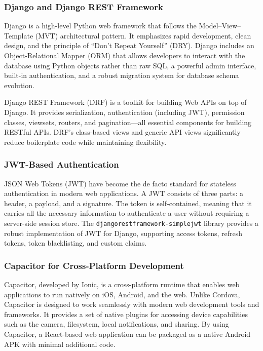 \subsubsection{Django and Django REST Framework}
Django is a high-level Python web framework that follows the Model--View--Template (MVT) architectural pattern. It emphasizes rapid development, clean design, and the principle of ``Don't Repeat Yourself'' (DRY). Django includes an Object-Relational Mapper (ORM) that allows developers to interact with the database using Python objects rather than raw SQL, a powerful admin interface, built-in authentication, and a robust migration system for database schema evolution.

Django REST Framework (DRF) is a toolkit for building Web APIs on top of Django. It provides serialization, authentication (including JWT), permission classes, viewsets, routers, and pagination---all essential components for building RESTful APIs. DRF's class-based views and generic API views significantly reduce boilerplate code while maintaining flexibility.

\subsubsection{JWT-Based Authentication}
JSON Web Tokens (JWT) have become the de facto standard for stateless authentication in modern web applications. A JWT consists of three parts: a header, a payload, and a signature. The token is self-contained, meaning that it carries all the necessary information to authenticate a user without requiring a server-side session store. The \texttt{djangorestframework-simplejwt} library provides a robust implementation of JWT for Django, supporting access tokens, refresh tokens, token blacklisting, and custom claims.

\subsubsection{Capacitor for Cross-Platform Development}
Capacitor, developed by Ionic, is a cross-platform runtime that enables web applications to run natively on iOS, Android, and the web. Unlike Cordova, Capacitor is designed to work seamlessly with modern web development tools and frameworks. It provides a set of native plugins for accessing device capabilities such as the camera, filesystem, local notifications, and sharing. By using Capacitor, a React-based web application can be packaged as a native Android APK with minimal additional code.

